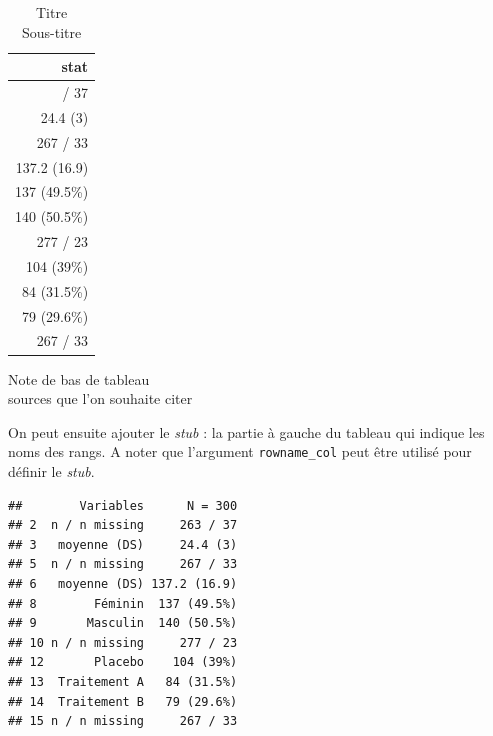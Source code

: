 \documentclass[
]{book}
\newenvironment{Shaded}{\begin{snugshade}}{\end{snugshade}}
\newcommand{\AttributeTok}[1]{\textcolor[rgb]{0.13,0.29,0.53}{#1}}
\newcommand{\DocumentationTok}[1]{\textcolor[rgb]{0.56,0.35,0.01}{\textbf{\textit{#1}}}}
\newcommand{\FunctionTok}[1]{\textcolor[rgb]{0.13,0.29,0.53}{\textbf{#1}}}
\newcommand{\NormalTok}[1]{#1}
\newcommand{\OtherTok}[1]{\textcolor[rgb]{0.56,0.35,0.01}{#1}}
\newcommand{\SpecialCharTok}[1]{\textcolor[rgb]{0.81,0.36,0.00}{\textbf{#1}}}
\newcommand{\StringTok}[1]{\textcolor[rgb]{0.31,0.60,0.02}{#1}}
\begin{document}
\begin{table}[t]
\caption*{
{\fontsize{20}{25}\selectfont  Titre\fontsize{12}{15}\selectfont } \\ 
{\fontsize{14}{17}\selectfont  Sous-titre\fontsize{12}{15}\selectfont }
} 
\fontsize{12.0pt}{14.0pt}\selectfont
\begin{tabular*}{\linewidth}{@{\extracolsep{\fill}}r}
\toprule
stat \\ 
\midrule\addlinespace[2.5pt]
263 / 37 \\ 
24.4 (3) \\ 
267 / 33 \\ 
137.2 (16.9) \\ 
137 (49.5\%) \\ 
140 (50.5\%) \\ 
277 / 23 \\ 
104 (39\%) \\ 
84 (31.5\%) \\ 
79 (29.6\%) \\ 
267 / 33 \\ 
\bottomrule
\end{tabular*}
\begin{minipage}{\linewidth}
\vspace{.05em}
Note de bas de tableau\\
sources que l'on souhaite citer\\
\end{minipage}
\end{table}

On peut ensuite ajouter le \emph{stub} : la partie à gauche du tableau qui indique les noms des rangs. A noter que l'argument \texttt{rowname\_col} peut être utilisé pour définir le \emph{stub}.

\begin{Shaded}
\end{Shaded}

\begin{verbatim}
##        Variables      N = 300
## 2  n / n missing     263 / 37
## 3   moyenne (DS)     24.4 (3)
## 5  n / n missing     267 / 33
## 6   moyenne (DS) 137.2 (16.9)
## 8        Féminin  137 (49.5%)
## 9       Masculin  140 (50.5%)
## 10 n / n missing     277 / 23
## 12       Placebo    104 (39%)
## 13  Traitement A   84 (31.5%)
## 14  Traitement B   79 (29.6%)
## 15 n / n missing     267 / 33
\end{verbatim}
\end{document}
